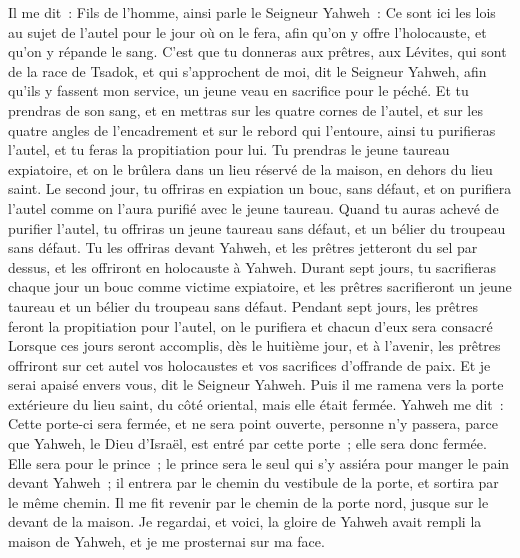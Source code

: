 \begin{multicols}{2}
Il me dit~: Fils de l'homme, ainsi parle le Seigneur Yahweh~: Ce sont ici les lois au sujet de l'autel pour le jour où on le fera, afin qu'on y offre l'holocauste, et qu'on y répande le sang.
C'est que tu donneras aux prêtres, aux Lévites, qui sont de la race de Tsadok, et qui s'approchent de moi, dit le Seigneur Yahweh, afin qu'ils y fassent mon service, un jeune veau en sacrifice pour le péché.
Et tu prendras de son sang, et en mettras sur les quatre cornes de l'autel, et sur les quatre angles de l'encadrement et sur le rebord qui l'entoure, ainsi tu purifieras l'autel, et tu feras la propitiation pour lui.
Tu prendras le jeune taureau expiatoire, et on le brûlera dans un lieu réservé de la maison, en dehors du lieu saint.
Le second jour, tu offriras en expiation un bouc, sans défaut, et on purifiera l'autel comme on l'aura purifié avec le jeune taureau.
Quand tu auras achevé de purifier l'autel, tu offriras un jeune taureau sans défaut, et un bélier du troupeau sans défaut.
Tu les offriras devant Yahweh, et les prêtres jetteront du sel par dessus, et les offriront en holocauste à Yahweh.
Durant sept jours, tu sacrifieras chaque jour un bouc comme victime expiatoire, et les prêtres sacrifieront un jeune taureau et un bélier du troupeau sans défaut.
Pendant sept jours, les prêtres feront la propitiation pour l'autel, on le purifiera et chacun d'eux sera consacré
Lorsque ces jours seront accomplis, dès le huitième jour, et à l'avenir, les prêtres offriront sur cet autel vos holocaustes et vos sacrifices d'offrande de paix. Et je serai apaisé envers vous, dit le Seigneur Yahweh.
\VerseOne{}Puis il me ramena vers la porte extérieure du lieu saint, du côté oriental, mais elle était fermée.
Yahweh me dit~: Cette porte-ci sera fermée, et ne sera point ouverte, personne n'y passera, parce que Yahweh, le Dieu d'Israël, est entré par cette porte~; elle sera donc fermée.
Elle sera pour le prince~; le prince sera le seul qui s'y assiéra pour manger le pain devant Yahweh~; il entrera par le chemin du vestibule de la porte, et sortira par le même chemin.
Il me fit revenir par le chemin de la porte nord, jusque sur le devant de la maison. Je regardai, et voici, la gloire de Yahweh avait rempli la maison de Yahweh, et je me prosternai sur ma face.

\end{multicols}
